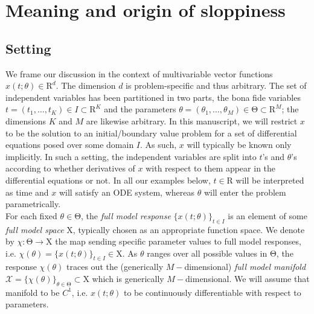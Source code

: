 \documentclass{article}
\newcommand{\p}{\theta}
\newcommand{\fmr}{\chi}
\newcommand{\fmm}{\mathcal{X}}
\newcommand{\R}{\mathrm{R}}
\newcommand{\ps}{\mathrm{\Theta}}
\newcommand{\fms}{\mathrm{X}}
\begin{document}
\section{Meaning and origin of sloppiness}

\subsection{Setting}
%
We frame our discussion in the context of multivariable vector functions $x(t;\p) \in \R^d$.
The dimension $d$ is problem-specific and thus arbitrary.
The set of independent variables has been partitioned in two parts, the bona fide variables $t = (t_1,\ldots,t_K) \in I \subset \R^K$ and the parameters $\p = (\p_1,\ldots,\p_M) \in \ps \subset \R^M$; the dimensions $K$ and $M$ are likewise arbitrary.
In this manuscript, we will restrict $x$ to be the solution to an initial/boundary value problem for a set of differential equations posed over some domain $I$.
As such, $x$ will typically be known only implicitly.
In such a setting, the independent variables are split into $t$'s and $\p$'s according to whether derivatives of $x$ with respect to them appear in the differential equations or not.
In all our examples below,  $t\in\R$ will be interpreted as time and $x$ will satisfy an ODE system, whereas $\p$ will enter the problem parametrically.\\

For each fixed $\p\in\ps$, the \emph{full model response} $\{x(t;\p) \}_{t \in I}$ is an element of some \emph{full model space} $\fms$, typically chosen as an appropriate function space.
We denote by $\fmr : \ps \to \fms$ the map sending specific parameter values to
full model responses, i.e. $\fmr(\p) = \{ x(t;\p) \}_{t \in I} \in \fms$.
As $\p$ ranges over all possible values in $\ps$, the response $\fmr(\p)$ traces out the (generically $M-$dimensional) \emph{full model manifold} $\fmm =
\{ \fmr(\p) \}_{\p \in \ps}
\subset
\fms$
which is  generically $M-$dimensional.
We will assume that manifold to be $C^1$, i.e. $x(t;\p)$ to be continuously differentiable with respect to parameters.\\
\end{document}
